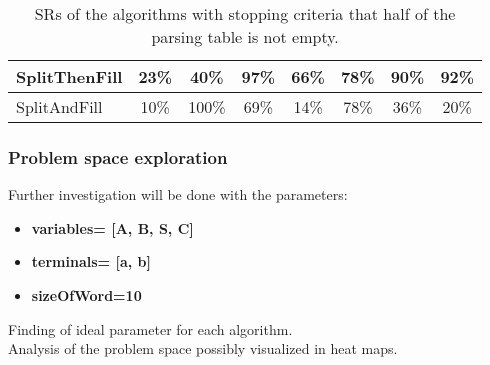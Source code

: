 \begin{table}[h]
\begin{tabular}{|l|c|c|c|c|c|c|c|}
		SplitThenFill                   &23\%    &40\%                                                           &97\%                                                              &66\%      &78\%                                                        &90\%                                                         &92\%                                                           \\ \hline
		SplitAndFill                    &10\%      &100\%                                                           &69\%                                                              &14\%      &78\%                                                        &36\%                                                         &20\%                                                           \\ \hline
	\end{tabular}
	\caption{SRs of the algorithms with stopping criteria that half of the parsing table is not empty.}
	\label{ComparisionMoreThanHalf}
\end{table}
\subsubsection{Problem space exploration}
Further investigation will be done with the parameters:
\begin{itemize} [noitemsep]
	\item \textbf{variables= [A, B, S, C]}
	\item \textbf{terminals= [a, b]}
	\item \textbf{sizeOfWord=10}
\end{itemize} 


Finding of ideal parameter for each algorithm.\\
Analysis of the problem space possibly visualized in heat maps.
\clearpage
\pagebreak